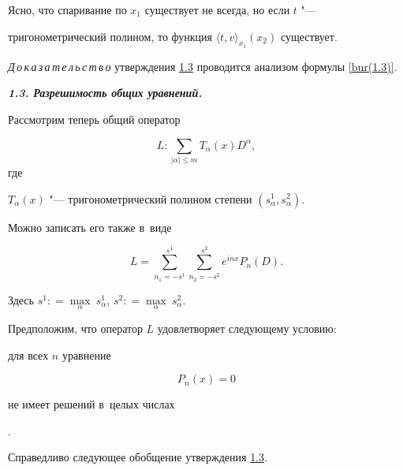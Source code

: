 Ясно, что спаривание по $x_1$ существует не всегда, но если $t$ "---

тригонометрический полином, то функция  $\langle t, v \rangle_{x_1} (x_2)$ существует.



\smallskip



{\it  Д\,о\,к\,а\,з\,а\,т\,е\,л\,ь\,с\,т\,в\,о\/} утверждения \hyperlink{bur:utv:1.3}{1.3} проводится анализом формулы \eqref{bur(1.3)}.



\smallskip



\hypertarget{bur.1.3}{}



{\bf \itshape 1.3. Разрешимость общих уравнений.}

Рассмотрим теперь общий оператор

$$L : \sum_{|\alpha| \le m} T_\alpha (x) D^\alpha,

$$ где

$T_\alpha (x)$ "--- тригонометрический полином степени $(s_\alpha^1, s_\alpha^2)$.

Можно записать его также в~виде

$$

L = \sum^{s^1}_{n_1 = - s^1} \sum^{s^2}_{n_2 = - s^2} e^{i n x} P_n (D).

$$

Здесь $s^1 : = \underset {\alpha}{\max}\ s^1_\alpha$, $ s^2 : = \underset

{\alpha}{\max}\ s^2_\alpha$.



Предположим, что оператор $L$ удовлетворяет следующему условию: {\it

для всех $n$ уравнение

\begin{equation}

P_n (x) = 0

\label{bur(1.4)}

\end{equation}

не имеет решений в~целых числах}.



\smallskip



Справедливо следующее обобщение утверждения \hyperlink{bur:utv:1.3}{1.3}.







